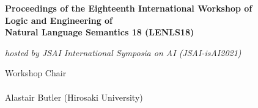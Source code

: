 \documentclass[12pt]{jarticle}
\begin{document}
\pagestyle{empty}

\vspace*{1cm}
\begin{Large}
\begin{center}
{\bf Proceedings of the Eighteenth International Workshop of \\
     Logic and Engineering of \\Natural Language Semantics 18 (LENLS18)}
\end{center}
\end{Large}
\vspace*{1cm}
\begin{Large}
\begin{center}
{\em hosted by JSAI International Symposia on AI (JSAI-isAI2021)}
\end{center}
\end{Large}
\begin{large}
\vspace*{1cm}
\begin{center}
Workshop Chair\\ $\;$\\
Alastair Butler (Hirosaki University)
\end{center}
\end{large}
\vspace*{3cm}
\begin{center}
\centerline{
\hspace*{30pt}
}
\end{center}
\end{document}
